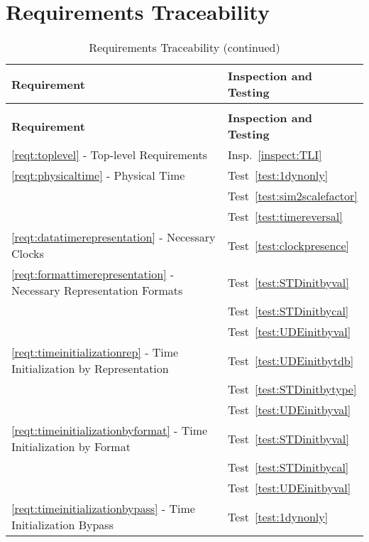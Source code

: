 \section{Requirements Traceability}\label{sec:traceability}

\begin{longtable}[c]{||p{3in}|p{3in}|}
\caption{Requirements Traceability} \\[6pt]
\hline
{\bf Requirement} & {\bf Inspection and Testing} \\ 
\hline \hline
\endfirsthead
\hline
\endfoot
\caption[]{Requirements Traceability (continued)} \\[6pt]
\hline
{\bf Requirement} & {\bf Inspection and Testing} \\ 
\hline \hline
\endhead

\ref{reqt:toplevel} - Top-level Requirements &
  Insp.~\ref{inspect:TLI} \\ 
  \hline

\ref{reqt:physicaltime} - Physical Time  &
 Test~\ref{test:1dynonly} \\
 &Test~\ref{test:sim2scalefactor} \\  
 &Test~\ref{test:timereversal} \\  
  \hline

\ref{reqt:datatimerepresentation} - Necessary Clocks 
 &Test~\ref{test:clockpresence} \\  
  \hline

\ref{reqt:formattimerepresentation} - Necessary Representation Formats 
 &Test~\ref{test:STDinitbyval} \\  
 &Test~\ref{test:STDinitbycal} \\  
 &Test~\ref{test:UDEinitbyval} \\  
  \hline

\ref{reqt:timeinitializationrep} - Time Initialization by Representation 
 &Test~\ref{test:UDEinitbytdb} \\  
 &Test~\ref{test:STDinitbytype} \\  
 &Test~\ref{test:UDEinitbyval} \\  
  \hline

\ref{reqt:timeinitializationbyformat} - Time Initialization by Format  
 &Test~\ref{test:STDinitbyval} \\  
 &Test~\ref{test:STDinitbycal} \\  
 &Test~\ref{test:UDEinitbyval} \\  
  \hline

\ref{reqt:timeinitializationbypass} - Time Initialization Bypass  
 &Test~\ref{test:1dynonly} \\  
  \hline


\end{longtable}

